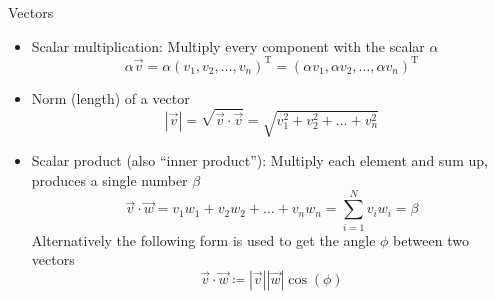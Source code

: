   \begin{frame}{Vectors}
    \begin{itemize}
      \item Scalar multiplication:
        Multiply every component with the scalar $\alpha$
        \begin{equation*}
          \alpha \vec{v} =
            \alpha \left(v_1, v_2, \dots, v_n\right)^\mathrm{T} =
            \left(\alpha v_1, \alpha v_2, \dots, \alpha v_n\right)^\mathrm{T}
        \end{equation*}
      \item Norm (length) of a vector
        \begin{equation*}
          |\vec{v}| = \sqrt{\vec{v}\cdot \vec{v}} =
            \sqrt{v_1^2 + v_2^2 + \dots + v_n^2}
        \end{equation*}
      \item Scalar product (also \enquote{inner product}):
        Multiply each element and sum up, produces a single number $\beta$
        \begin{equation*}
          \vec{v}\cdot \vec{w} =
            v_1 w_1 + v_2 w_2 + \dots + v_n w_n =
            \sum_{i=1}^{N} v_i w_i = \beta
        \end{equation*}
        Alternatively the following form is used to get the angle $\phi$
          between two vectors
        \begin{equation*}
          \vec{v}\cdot \vec{w} \coloneqq |\vec{v}||\vec{w}|\cos(\phi)
        \end{equation*}

    \end{itemize}
  \end{frame}


